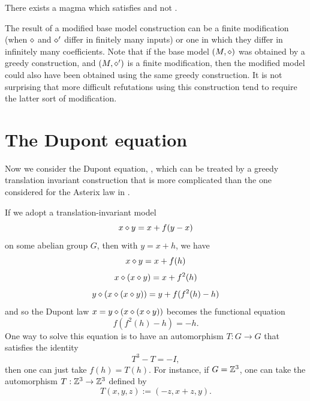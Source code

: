 \begin{theorem}\label{non_imp_1659_4315_thm}
  \leanok
  There exists a magma which satisfies  and not .
\end{theorem}

The result of a modified base model construction can be a finite modification (when $\diamond$ and $\diamond'$
differ in finitely many inputs) or one in which they differ in infinitely many coefficients. Note that if the base
model $(M,\diamond)$ was obtained by a greedy construction, and $(M,\diamond')$ is a finite modification, then the
modified model could also have been obtained using the same greedy construction. It is not surprising that
more difficult refutations using this construction tend to require the latter sort of modification.


\section{The Dupont equation}\label{dupont-section}

Now we consider the Dupont equation, , which can be treated by a greedy translation invariant construction that is more complicated than the one considered for the Asterix law in .

If we adopt a translation-invariant model
$$ x \diamond y = x + f(y-x)$$
on some abelian group $G$, then with $y = x+h$, we have
$$ x \diamond y = x + f(h)$$
$$ x \diamond (x \diamond y) = x + f^2(h)$$
$$ y \diamond (x \diamond (x \diamond y)) = y + f(f^2(h)-h)$$
and so the Dupont law $x = y \diamond (x \diamond (x \diamond y))$ becomes the functional equation
\begin{equation}\label{dupont-eq}
  f(f^2(h)-h) = -h.
\end{equation}
One way to solve this equation is to have an automorphism $T: G \to G$ that satisfies the identity
$$ T^3 - T = -I,$$
then one can just take $f(h) = T(h)$.  For instance, if $G = \mathbb{Z}^3$, one can take the automorphism $T: \mathbb{Z}^3 \to \mathbb{Z}^3$ defined by
$$ T(x,y,z) := (-z,x+z,y).$$


